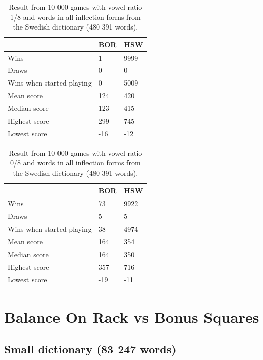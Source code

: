 \documentclass[a4paper, 12pt]{report}
\begin{document}
\begin{table}[h]
\centering
    \begin{tabular}{ l | l | l }
   	& BOR & HSW \\
   	\hline
   	Wins & 1 & 9999 \\
	Draws & 0 & 0 \\
	Wins when started playing & 0 & 5009 \\   	
	Mean score & 124 & 420 \\
	Median score & 123 & 415 \\	 	 
	Highest score & 299 & 745 \\
	Lowest score & -16 & -12 \\		
    \end{tabular}
\caption{Result from 10 000 games with vowel ratio 1/8 and words in all inflection forms from the Swedish dictionary (480 391 words).}
\label{tab:borhswstats1}
\end{table}

\begin{table}[h]
\centering
    \begin{tabular}{ l | l | l }
   	& BOR & HSW \\
   	\hline
   	Wins & 73 & 9922 \\
	Draws & 5 & 5 \\
	Wins when started playing & 38 & 4974 \\   	
	Mean score & 164 & 354 \\
	Median score & 164 & 350 \\	 	 
	Highest score & 357 & 716 \\
	Lowest score & -19 & -11 \\		
    \end{tabular}
\caption{Result from 10 000 games with vowel ratio 0/8 and words in all inflection forms from the Swedish dictionary (480 391 words).}
\label{tab:borhswstats0}
\end{table}

\FloatBarrier
\section{Balance On Rack vs Bonus Squares} 
\label{sec:tablesbs}
\subsection{Small dictionary (83 247 words)}
\end{document}
